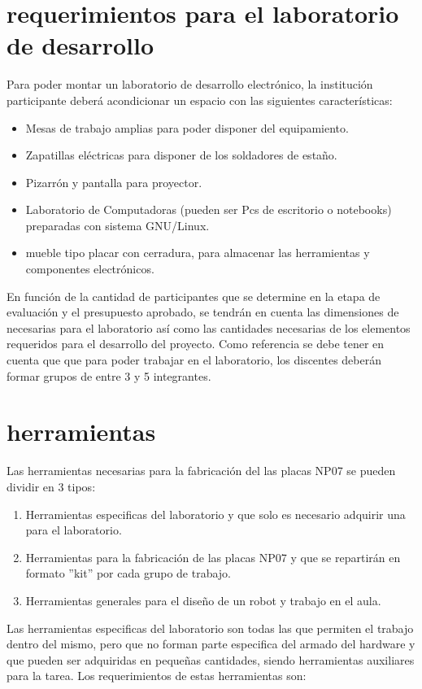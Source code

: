 \section{requerimientos para el laboratorio de desarrollo}
Para poder montar un laboratorio de desarrollo electrónico, la institución participante deberá acondicionar un espacio con las siguientes características:

\begin{itemize}
  \item Mesas de trabajo amplias para poder disponer del equipamiento.
  \item Zapatillas eléctricas para disponer de los soldadores de estaño.
  \item Pizarrón y pantalla para proyector.
  \item Laboratorio de Computadoras (pueden ser Pcs de escritorio o notebooks) preparadas con sistema GNU/Linux.
  \item mueble tipo placar con cerradura, para almacenar las herramientas y componentes electrónicos. 
\end{itemize}

En función de la cantidad de participantes que se determine en la etapa de evaluación y el presupuesto aprobado, se tendrán en cuenta las dimensiones de necesarias para el laboratorio así como las cantidades necesarias de los elementos requeridos para el desarrollo del proyecto. Como referencia se debe tener en cuenta que que para poder trabajar en el laboratorio, los discentes deberán formar grupos de entre 3 y 5 integrantes. 

\section{herramientas}

Las herramientas necesarias para la fabricación del las placas NP07 se pueden dividir en 3 tipos: 

\begin{enumerate}
  \item Herramientas especificas del laboratorio y que solo es necesario adquirir una para el laboratorio.
  \item Herramientas para la fabricación de las placas NP07 y que se repartirán en formato ''kit'' por cada grupo de trabajo.
  \item Herramientas generales para el diseño de un robot y trabajo en el aula.
\end{enumerate}

Las herramientas especificas del laboratorio son todas las que permiten el trabajo dentro del mismo, pero que no forman parte especifica del armado del hardware y que pueden ser adquiridas en pequeñas cantidades, siendo herramientas auxiliares para la tarea. Los requerimientos de estas herramientas son:

